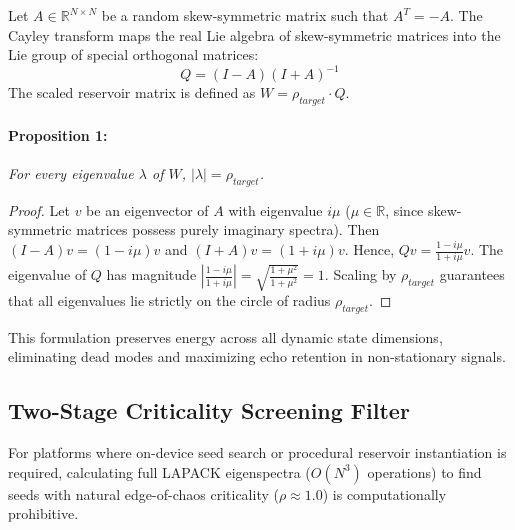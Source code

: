 Let $A \in \mathbb{R}^{N \times N}$ be a random skew-symmetric matrix such that $A^T = -A$. The Cayley transform maps the real Lie algebra of skew-symmetric matrices into the Lie group of special orthogonal matrices:
\begin{equation}
    Q = (I - A)(I + A)^{-1}
    \label{eq:cayley}
\end{equation}
The scaled reservoir matrix is defined as $W = \rho_{target} \cdot Q$. 
\paragraph{Proposition 1:} \textit{For every eigenvalue $\lambda$ of $W$, $|\lambda| = \rho_{target}$.}
\begin{proof}
Let $v$ be an eigenvector of $A$ with eigenvalue $i \mu$ ($\mu \in \mathbb{R}$, since skew-symmetric matrices possess purely imaginary spectra). Then $(I - A) v = (1 - i \mu) v$ and $(I + A) v = (1 + i \mu) v$. Hence, $Q v = \frac{1 - i \mu}{1 + i \mu} v$. The eigenvalue of $Q$ has magnitude $\left| \frac{1 - i \mu}{1 + i \mu} \right| = \sqrt{\frac{1 + \mu^2}{1 + \mu^2}} = 1$. Scaling by $\rho_{target}$ guarantees that all eigenvalues lie strictly on the circle of radius $\rho_{target}$.
\end{proof}
This formulation preserves energy across all dynamic state dimensions, eliminating dead modes and maximizing echo retention in non-stationary signals.

\subsection{Two-Stage Criticality Screening Filter}
For platforms where on-device seed search or procedural reservoir instantiation is required, calculating full LAPACK eigenspectra ($O(N^3)$ operations) to find seeds with natural edge-of-chaos criticality ($\rho \approx 1.0$) is computationally prohibitive. 

